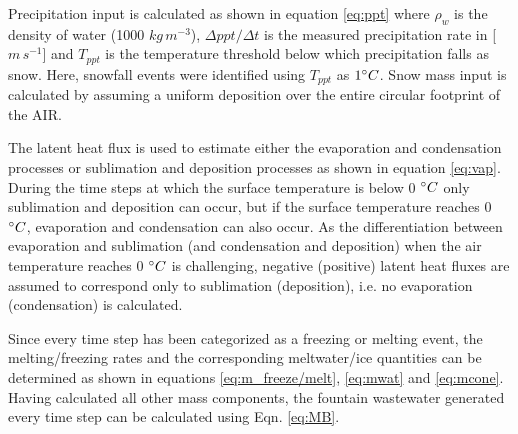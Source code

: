 Precipitation input is calculated as shown in equation \ref{eq:ppt} where $\rho_{w}$ is the density of water (1000
$kg\,m^{-3}$), $\Delta ppt/ \Delta t$ is the measured precipitation rate in [$m\,s^{-1}$] and $T_{ppt}$ is the temperature threshold
below which precipitation falls as snow. Here, snowfall events were identified using $T_{ppt}$ as $1 ^{\circ} C$. Snow
mass input is calculated by assuming a uniform deposition over the entire circular footprint of the AIR.

The latent heat flux is used to estimate either the evaporation and condensation processes or sublimation and
deposition processes as shown in equation \ref{eq:vap}. During the time steps at which the surface temperature
is below 0 $^{\circ} C$ only sublimation and deposition can occur, but if the surface temperature reaches 0
$^{\circ} C$, evaporation and condensation can also occur. As the differentiation between evaporation and
sublimation (and condensation and deposition) when the air temperature reaches 0 $^{\circ} C$ is challenging,
negative (positive) latent heat fluxes are assumed to correspond only to sublimation (deposition), i.e. no
evaporation (condensation) is calculated.

Since every time step has been categorized as a freezing or melting event, the melting/freezing rates and the
corresponding meltwater/ice quantities can be determined as shown in equations \ref{eq:m_freeze/melt},
\ref{eq:mwat} and \ref{eq:mcone}. Having calculated all other mass components, the fountain wastewater generated
every time step can be calculated using Eqn. \ref{eq:MB}.

